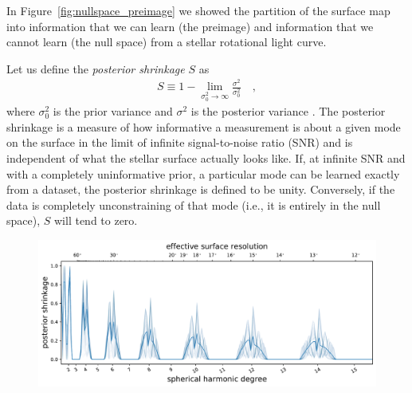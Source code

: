 \documentclass[modern]{aastex62}
\begin{document}
In Figure~\ref{fig:nullspace_preimage} we showed the partition of the surface map into
information that we can learn (the preimage) and information that we cannot learn
(the null space) from a stellar rotational light curve.

Let us define the \emph{posterior shrinkage} $S$ as
%
\begin{align}
    \label{eq:shrinkage}
    S \equiv 1 - \lim\limits_{\sigma_0^2 \rightarrow \infty}
    \frac{\sigma^2}{\sigma_0^2}
    \quad,
\end{align}
%
where $\sigma_0^2$ is the prior variance
and $\sigma^2$ is the posterior variance \citep[see, e.g.,][]{Betancourt2018}.
The posterior shrinkage is a measure of how informative a measurement is about a
given mode on the surface in the limit of infinite signal-to-noise ratio (SNR)
and is independent of what the stellar surface actually looks like.
If, at infinite SNR and with a completely uninformative prior,
a particular mode can be learned exactly from a dataset, the posterior
shrinkage is defined to be unity. Conversely, if the data is completely
unconstraining of that mode (i.e., it is entirely in the null space),
$S$ will tend to zero.

\begin{figure}[t!]
    \begin{centering}
        \includegraphics[width=\linewidth]{figures/nullspace_ensemble_single.pdf}
    \end{centering}
\end{figure}

\end{document}
